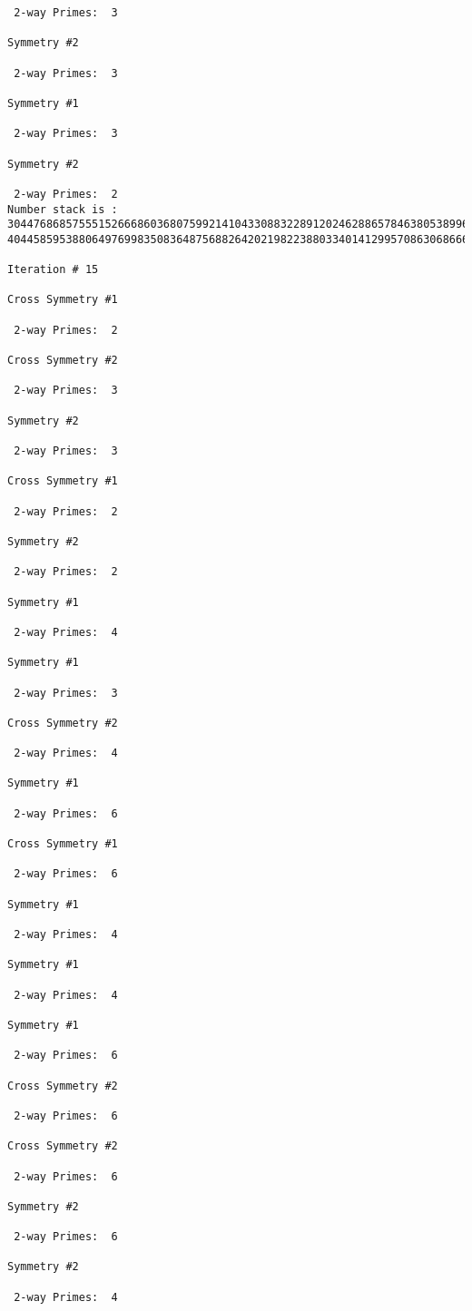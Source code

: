 {{{{\begin{verbatim}
 2-way Primes: 	3

Symmetry #2

 2-way Primes: 	3

Symmetry #1

 2-way Primes: 	3

Symmetry #2

 2-way Primes: 	2
Number stack is :
30447686857555152666860368075992141043308832289120246288657846380538996794608835958544046240163340857
40445859538806497699835083648756882642021982238803340141299570863068666251555758686744037580433610426

Iteration #	15

Cross Symmetry #1

 2-way Primes: 	2

Cross Symmetry #2

 2-way Primes: 	3

Symmetry #2

 2-way Primes: 	3

Cross Symmetry #1

 2-way Primes: 	2

Symmetry #2

 2-way Primes: 	2

Symmetry #1

 2-way Primes: 	4

Symmetry #1

 2-way Primes: 	3

Cross Symmetry #2

 2-way Primes: 	4

Symmetry #1

 2-way Primes: 	6

Cross Symmetry #1

 2-way Primes: 	6

Symmetry #1

 2-way Primes: 	4

Symmetry #1

 2-way Primes: 	4

Symmetry #1

 2-way Primes: 	6

Cross Symmetry #2

 2-way Primes: 	6

Cross Symmetry #2

 2-way Primes: 	6

Symmetry #2

 2-way Primes: 	6

Symmetry #2

 2-way Primes: 	4


\end{verbatim}}}}}
